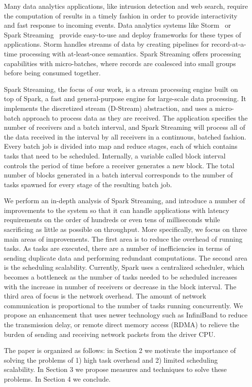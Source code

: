 \noindent

Many data analytics applications, like intrusion detection and web search, require the computation of results in a timely fashion in order to provide interactivity and fast response to incoming events.
Data analytics systems like Storm~\cite{Storm} or Spark Streaming~\cite{SparkStreaming} provide easy-to-use and deploy frameworks for these types of applications. Storm handles streams of data by creating pipelines for record-at-a-time processing with at-least-once semantics. Spark Streaming offers processing capabilities with micro-batches, where records are coalesced into small groups before being consumed together.

Spark Streaming, the focus of our work, is a stream processing engine built on top of Spark, a fast and general-purpose engine for large-scale data processing. It implements the discretized stream (D-Stream) abstraction, and uses a micro-batch approach to process data as they are received. The application specifies the number of receivers and a batch interval, and Spark Streaming will process all of the data received in the interval by all receivers in a continuous, batched fashion. Every batch job is divided into map and reduce stages, each of which contains tasks that need to be scheduled. Internally, a variable called block interval controls the period of time before a receiver generates a new block. The total number of blocks generated in a batch interval corresponds to the number of tasks spawned for every stage of the resulting batch job.

We perform an in-depth analysis of Spark Streaming, and introduce a number of improvements to the system so that it can handle applications with latency requirements on the order of hundreds or even tens of milliseconds while sacrificing as little as possible on throughput. More specifically, we focus on three main areas of improvements. The first area is to reduce the overhead of running tasks. As tasks are executed, there are a number of inefficiencies in terms of sending duplicate data and performing redundant computations. The second area is the scheduling scalability. Currently, Spark uses a centralized scheduler, which becomes a bottleneck as the number of tasks needed to be scheduled increases with the increase in number of receivers or decrease in the block interval. The third area of focus is the network overhead. The amount of network communication is proportional to the number of tasks running concurrently. We propose an enhancement that uses newer technology such as InfiniBand to reduce the transmission delay, or remote direct memory access (RDMA) to relieve the burden of sending and receiving network packets from the driver CPU.

The paper is organized as follows: in Section 2 we motivate the importance of solving the problems of 1) high task overhead and 2) limited scheduling scalability. In Section 3 we propose measures and techniques to solve these problems. In Section 4 we conclude.

